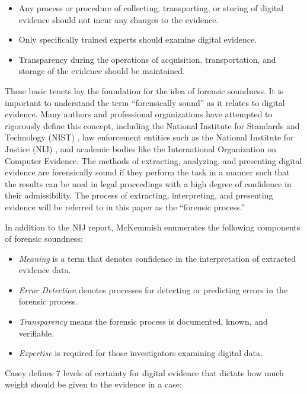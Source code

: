\begin{itemize}
\item Any process or procedure of collecting, transporting, or storing of digital evidence should not incur any changes to the evidence.
\item Only specifically trained experts should examine digital evidence.
\item Transparency during the operations of acquisition, transportation, and storage of the evidence should be maintained.
\end{itemize}

These basic tenets lay the foundation for the idea of forensic soundness. It is important to understand the term “forensically sound” 
as it relates to digital evidence. Many authors and professional organizations have attempted to rigorously define this concept, 
including the National Institute for Standards and Technology (NIST) \cite{NIST2001}, law enforcement entities such as the National Institute for 
Justice (NIJ) \cite{NIJ2008}, and academic bodies like the International Organization on Computer Evidence\cite{IOCE2002}. The methods of extracting, analyzing, 
and presenting digital evidence are forensically sound if they perform the task in a manner such that the results can be used in legal 
proceedings with a high degree of confidence in their admissibility. The process of extracting, interpreting, and presenting evidence 
will be referred to in this paper as the “forensic process.”

In addition to the NIJ report, McKemmish \cite{mckemmish2008} enumerates the following components of forensic soundness:

\begin{itemize}
\item \emph{Meaning} is a term that denotes confidence in the interpretation of extracted evidence data.
\item \emph{Error Detection} denotes processes for detecting or predicting errors in the forensic process.
\item \emph{Transparency} means the forensic process is documented, known, and verifiable.
\item \emph{Expertise} is required for those investigators examining digital data.
\end{itemize}

Casey \cite{casey2002} defines 7 levels of certainty for digital evidence that dictate how much weight should be given to the evidence in a case:

